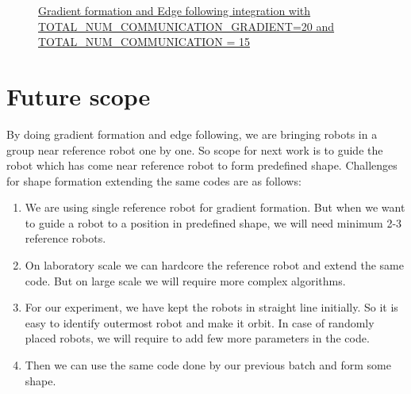 \documentclass{report}[12pt]
\begin{document}
\begin{figure}[H]
	\centering
	\caption{\href{https://drive.google.com/drive/folders/14PzarH4uEqTsYBiknOU7pAX3xXhWmLxa/view}{Gradient formation and Edge following integration with TOTAL\_NUM\_COMMUNICATION\_GRADIENT=20 and TOTAL\_NUM\_COMMUNICATION = 15}}
	\label{fig:Gradient formation and Edge following integration}
\end{figure}

\chapter{Future scope}
By doing gradient formation and edge following, we are bringing robots in a group near reference robot one by one.
So scope for next work is to guide the robot which has come near reference robot to form predefined shape.
\newline Challenges for shape formation extending the same codes are as follows:
\begin{enumerate}
    \item We are using single reference robot for gradient formation. But when we want to guide a robot to a position in predefined shape, we will need minimum 2-3 reference robots.
    \item On laboratory scale we can hardcore the reference robot and extend the same code. But on large scale we will require more complex algorithms.
    \item For our experiment, we have kept the robots in straight line initially. So it is easy to identify outermost robot and make it orbit. In case of randomly placed robots, we will require to add few more parameters in the code.
    \item Then we can use the same code done by our previous batch and form some shape.
\end{enumerate}
\end{document}
